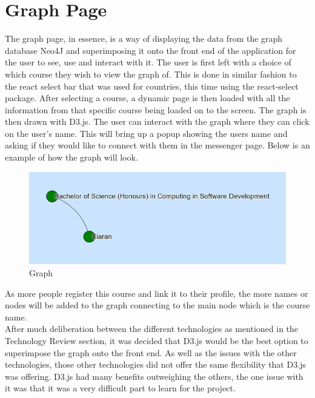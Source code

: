 \section{Graph Page}
The graph page, in essence, is a way of displaying the data from the graph database Neo4J and superimposing it onto the front end of the application for the user to see, use and interact with it. The user is first left with a choice of which course they wish to view the graph of. This is done in similar fashion to the react select bar that was used for countries, this time using the react-select package. After selecting a course, a dynamic page is then loaded with all the information from that specific course being loaded on to the screen. The graph is then drawn with D3.js. The user can interact with the graph where they can click on the user’s name. This will bring up a popup showing the users name and asking if they would like to connect with them in the messenger page. Below is an example of how the graph will look. \\
\begin{figure}[H]
    \centering
    \includegraphics{img/Graph1.png}
    \caption{Graph} 
    \label{fig:my_label}
\end{figure}

As more people register this course and link it to their profile, the more names or nodes will be added to the graph connecting to the main node which is the course name. \\

After much deliberation between the different technologies as mentioned in the Technology Review section, it was decided that D3.js would be the best option to superimpose the graph onto the front end. As well as the issues with the other technologies, those other technologies did not offer the same flexibility that D3.js was offering. D3.js had many benefits outweighing the others, the one issue with it was that it was a very difficult part to learn for the project. \\

